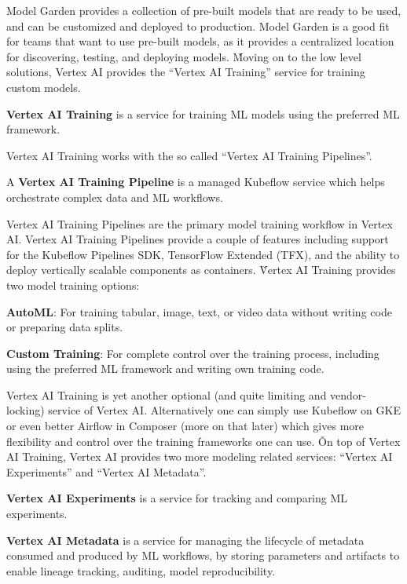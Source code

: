 Model Garden provides a collection of pre-built models that are ready to be used, and can be customized and deployed
to production. Model Garden is a good fit for teams that want to use pre-built models, as it provides a centralized
location for discovering, testing, and deploying models. \v

Moving on to the low level solutions, Vertex AI provides the ``Vertex AI Training'' service for training custom models.

\textbf{Vertex AI Training} is a service for training ML models using the preferred ML framework.
\ed

Vertex AI Training works with the so called ``Vertex AI  Training Pipelines''.

A \textbf{Vertex AI Training Pipeline} is a managed Kubeflow service which helps orchestrate complex data and ML
workflows.
\ed

Vertex AI Training Pipelines are the primary model training workflow in Vertex AI\@. Vertex AI Training Pipelines
provide a couple of features including support for the Kubeflow Pipelines SDK, TensorFlow Extended (TFX), and the
ability to deploy vertically scalable components as containers. \v

Vertex AI Training provides two model training options:
\bit
\item \textbf{AutoML}: For training tabular, image, text, or video data without writing code or preparing data splits.
\item \textbf{Custom Training}: For complete control over the training process, including using the preferred ML
framework and writing own training code.
\eit

Vertex AI Training is yet another optional (and quite limiting and vendor-locking) service of Vertex AI. Alternatively
one can simply use Kubeflow on GKE or even better Airflow in Composer (more on that later) which gives more flexibility
and control over the training frameworks one can use. \v

On top of Vertex AI Training, Vertex AI provides two more modeling related services: ``Vertex AI Experiments'' and
``Vertex AI Metadata''.

\textbf{Vertex AI Experiments} is a service for tracking and comparing ML experiments.
\ed

\textbf{Vertex AI Metadata} is a service for managing the lifecycle of metadata consumed and produced by ML workflows,
by storing parameters and artifacts to enable lineage tracking, auditing, model reproducibility.
\ed

